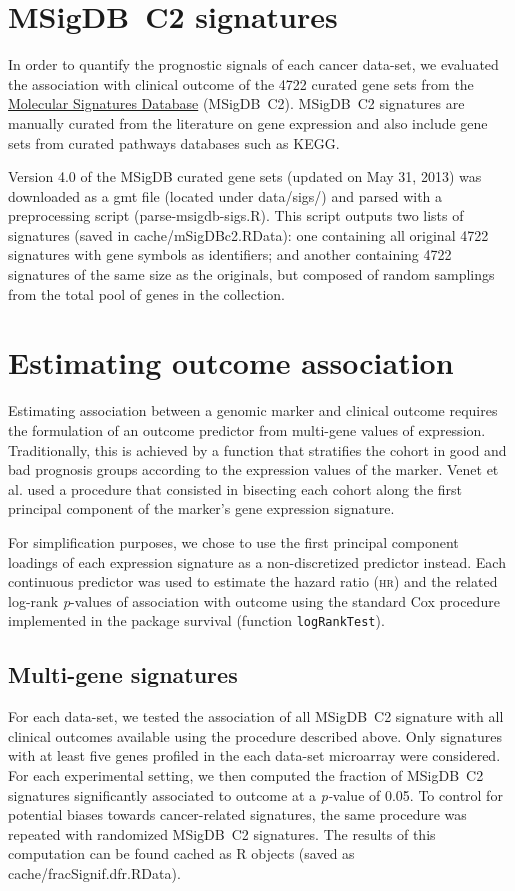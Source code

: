 \section{\mbox{MSigDB C2} signatures}
In order to quantify the prognostic signals of each cancer data-set, we
evaluated the association with clinical outcome of the 4722 curated gene sets
from the \href{http://www.broadinstitute.org/gsea/msigdb/index.jsp}{Molecular
  Signatures Database} (\mbox{MSigDB C2}).  \mbox{MSigDB C2} signatures are
manually curated from the literature on gene expression and also include gene
sets from curated pathways databases such as KEGG.

Version 4.0 of the MSigDB curated gene sets (updated on May 31, 2013) was
downloaded as a \textsf{gmt} file (located under \textsf{data/sigs/}) and parsed
with a preprocessing script (\textsf{parse-msigdb-sigs.R}).  This script outputs
two lists of signatures (saved in \textsf{cache/mSigDBc2.RData}): one containing
all original 4722 signatures with gene symbols as identifiers; and another
containing 4722 signatures of the same size as the originals, but composed of
random samplings from the total pool of genes in the collection.

\section{Estimating outcome association}

Estimating association between a genomic marker and clinical outcome requires
the formulation of an outcome predictor from multi-gene values of expression.
Traditionally, this is achieved by a function that stratifies the cohort in good
and bad prognosis groups according to the expression values of the marker.
Venet et al.\cite{venet_most_2011} used a procedure that consisted in bisecting
each cohort along the first principal component of the marker's gene expression
signature.

For simplification purposes, we chose to use the first principal component
loadings of each expression signature as a non-discretized predictor instead.
Each continuous predictor was used to estimate the hazard ratio (\textsc{hr})
and the related log-rank \emph{p}-values of association with outcome using the
standard Cox procedure implemented in the package \textsf{survival} (function
\texttt{logRankTest}).

\subsection{Multi-gene signatures}
For each data-set, we tested the association of all \mbox{MSigDB C2} signature
with all clinical outcomes available using the procedure described above.  Only
signatures with at least five genes profiled in the each data-set microarray
were considered.  For each experimental setting, we then computed the fraction
of \mbox{MSigDB C2} signatures significantly associated to outcome at a
\emph{p-}value of 0.05.  To control for potential biases towards cancer-related
signatures, the same procedure was repeated with randomized \mbox{MSigDB C2}
signatures.  The results of this computation can be found cached as \textsf{R}
objects (saved as \textsf{cache/fracSignif.dfr.RData}).

